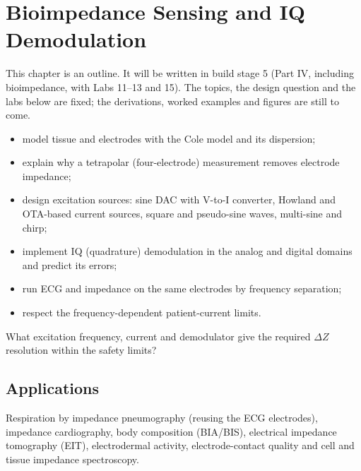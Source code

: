 \chapter{Bioimpedance Sensing and IQ Demodulation}\label{ch:bioz}

\begin{specnote}
This chapter is an outline. It will be written in build stage 5 (Part IV, including bioimpedance, with Labs 11--13 and 15). The topics, the design question and the labs below are fixed; the derivations, worked examples and figures are still to come.
\end{specnote}

\begin{objectives}
\begin{itemize}
  \item model tissue and electrodes with the Cole model and its dispersion;
  \item explain why a tetrapolar (four-electrode) measurement removes electrode impedance;
  \item design excitation sources: sine DAC with V-to-I converter, Howland and OTA-based current sources, square and pseudo-sine waves, multi-sine and chirp;
  \item implement IQ (quadrature) demodulation in the analog and digital domains and predict its errors;
  \item run ECG and impedance on the same electrodes by frequency separation;
  \item respect the frequency-dependent patient-current limits.
\end{itemize}
\end{objectives}

\begin{insight}
What excitation frequency, current and demodulator give the required $\Delta Z$ resolution within the safety limits?
\end{insight}

\section{Applications}\label{sec:ch28-1}
Respiration by impedance pneumography (reusing the ECG electrodes), impedance cardiography, body composition (BIA/BIS), electrical impedance tomography (EIT), electrodermal activity, electrode-contact quality and cell and tissue impedance spectroscopy.

